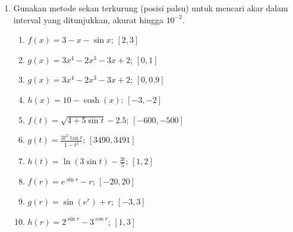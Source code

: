 \begin{enumerate}
\item \label{exc:bracketing-12}Gunakan metode sekan terkurung (posisi palsu)
untuk mencari akar dalam interval yang ditunjukkan, akurat hingga
$10^{-2}$.

\begin{enumerate}
\item $f(x)=3-x-\sin x$; $[2,3]$ \hasananswer 
\item $g(x)=3x^{4}-2x^{3}-3x+2$; $[0,1]$
\item $g(x)=3x^{4}-2x^{3}-3x+2$; $[0,0.9]$ \hasasolution 
\item $h(x)=10-\cosh(x)$; $[-3,-2]$
\item $f(t)=\sqrt{4+5\sin t}-2.5$; $[-600,-500]$ \hasananswer 
\item $g(t)=\frac{3t^{2}\tan t}{1-t^{2}}$; $[3490,3491]$
\item $h(t)=\ln(3\sin t)-\frac{3t}{5}$; $[1,2]$
\item $f(r)=e^{\sin r}-r$; $[-20,20]$ \hasasolution 
\item $g(r)=\sin(e^{r})+r$; $[-3,3]$
\item $h(r)=2^{\sin r}-3^{\cos r}$; $[1,3]$ \hasananswer 
\end{enumerate}
\end{enumerate}
